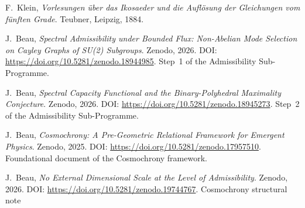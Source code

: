 F.~Klein,
\textit{Vorlesungen \"uber das Ikosaeder und die Aufl\"osung der Gleichungen vom f\"unften Grade}.
Teubner, Leipzig, 1884.

J.~Beau,
\textit{Spectral Admissibility under Bounded Flux: Non-Abelian Mode Selection on Cayley Graphs of SU(2) Subgroups}.
Zenodo, 2026.
DOI: \url{https://doi.org/10.5281/zenodo.18944985}.
Step~1 of the Admissibility Sub-Programme.

J.~Beau,
\textit{Spectral Capacity Functional and the Binary-Polyhedral Maximality Conjecture}.
Zenodo, 2026.
DOI: \url{https://doi.org/10.5281/zenodo.18945273}.
Step~2 of the Admissibility Sub-Programme.

J.~Beau,
\textit{Cosmochrony: A Pre-Geometric Relational Framework for Emergent Physics}.
Zenodo, 2025.
DOI: \url{https://doi.org/10.5281/zenodo.17957510}.
Foundational document of the Cosmochrony framework.

J.~Beau,
\textit{No External Dimensional Scale at the Level of Admissibility}.
Zenodo, 2026.
DOI: \url{https://doi.org/10.5281/zenodo.19744767}.
Cosmochrony structural note
